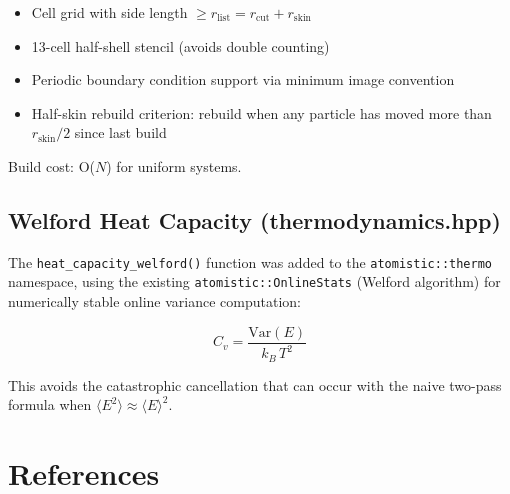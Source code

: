 \documentclass[11pt]{article}
\begin{document}
\begin{itemize}
  \item Cell grid with side length $\geq r_{\text{list}} = r_{\text{cut}} + r_{\text{skin}}$
  \item 13-cell half-shell stencil (avoids double counting)
  \item Periodic boundary condition support via minimum image convention
  \item Half-skin rebuild criterion: rebuild when any particle has moved
        more than $r_{\text{skin}}/2$ since last build
\end{itemize}

Build cost: O($N$) for uniform systems.

\subsection{Welford Heat Capacity (thermodynamics.hpp)}

The \texttt{heat\_capacity\_welford()} function was added to the
\texttt{atomistic::thermo} namespace, using the existing
\texttt{atomistic::OnlineStats} (Welford algorithm) for numerically
stable online variance computation:

\begin{equation}
  C_v = \frac{\mathrm{Var}(E)}{k_B \, T^2}
  \label{eq:welford-cv}
\end{equation}

This avoids the catastrophic cancellation that can occur with the
naive two-pass formula when $\langle E^2 \rangle \approx \langle E \rangle^2$.

\section{References}
\end{document}
